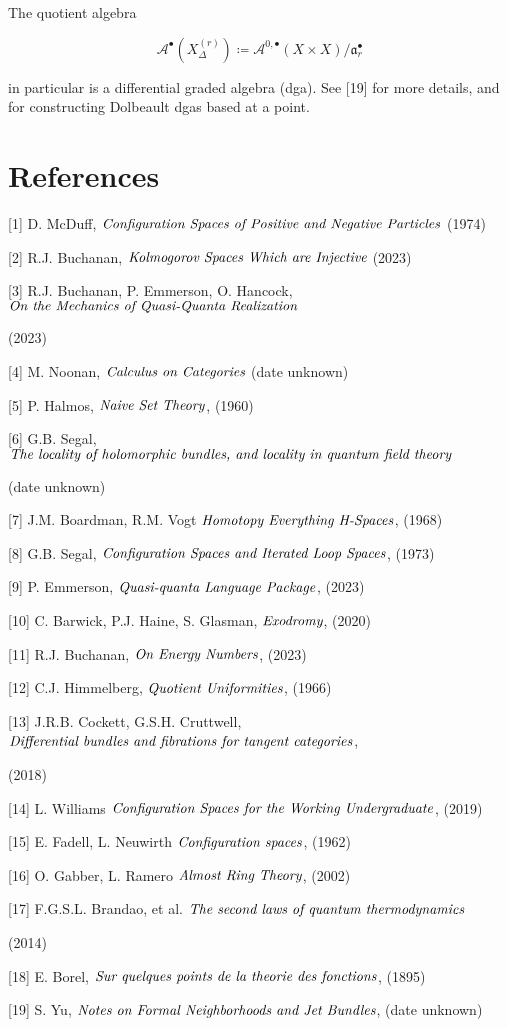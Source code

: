 \documentclass{article}
\begin{document}
		The quotient algebra
		
		$$\mathcal{A}^\bullet(X_\Delta^{(r)})\coloneq \mathcal{A}^{0,\bullet}(X\times X)/\mathfrak{a}_r^\bullet$$
		
		in particular is a differential graded algebra (dga). See [19] for more details, and for constructing Dolbeault dgas based at a point.
\pagebreak

	\section{References}
	\text{ }
	[1] D. McDuff, $\emph{Configuration Spaces of Positive and Negative Particles}$ (1974)
	
	[2] R.J. Buchanan, $\emph{Kolmogorov Spaces Which are Injective}$ (2023)
	
	[3] R.J. Buchanan, P. Emmerson, O. Hancock, $\emph{On the Mechanics of Quasi-Quanta Realization}$
	
		 (2023)
	
	[4] M. Noonan, $\emph{Calculus on Categories}$ (date unknown)
	
	[5] P. Halmos, $\emph{Naive Set Theory}$, (1960)
	
	[6] G.B. Segal, $\emph{The locality of holomorphic bundles, and locality in quantum field theory}$ 
	
	(date unknown)
	
	[7] J.M. Boardman, R.M. Vogt $\emph{Homotopy Everything H-Spaces}$, (1968)
	
	[8] G.B. Segal, $\emph{Configuration Spaces and Iterated Loop Spaces}$, (1973)
	
	[9] P. Emmerson, $\emph{Quasi-quanta Language Package}$, (2023)
	
	[10] C. Barwick, P.J. Haine, S. Glasman, $\emph{Exodromy}$, (2020)
	
	[11] R.J. Buchanan, $\emph{On Energy Numbers}$, (2023)
	
	[12] C.J. Himmelberg, $\emph{Quotient Uniformities}$, (1966)
	
	[13] J.R.B. Cockett, G.S.H. Cruttwell, $\emph{Differential bundles and fibrations for tangent categories}$,
	
	 (2018)
	 
	 [14] L. Williams $\emph{Configuration Spaces for the Working Undergraduate}$, (2019)
	 
	 [15] E. Fadell, L. Neuwirth $\emph{Configuration spaces}$, (1962)
	 
	 [16] O. Gabber, L. Ramero $\emph{Almost Ring Theory}$, (2002)
	 
	 [17] F.G.S.L. Brandao, et al. $\emph{The second laws of quantum thermodynamics}$ 
	 
	 	 (2014)
	 
	 [18] E. Borel, $\emph{Sur quelques points de la theorie des fonctions}$, (1895)
	 
	 [19] S. Yu, $\emph{Notes on Formal Neighborhoods and Jet Bundles}$, (date unknown)
	 
\end{document}
